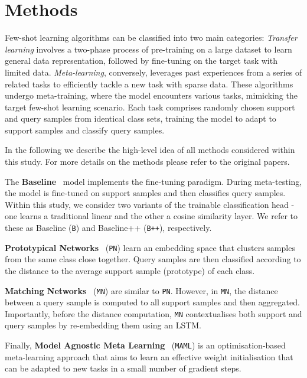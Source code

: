\section{Methods}

Few-shot learning algorithms can be classified into two main categories: \textit{Transfer learning} involves a two-phase process of pre-training on a large dataset to learn general data representation, 
followed by fine-tuning on the target task with limited data. \textit{Meta-learning}, conversely, leverages past experiences from a series of related tasks to efficiently tackle a new task with sparse data. 
These algorithms undergo meta-training, where the model encounters various tasks, mimicking the target few-shot learning scenario. Each task comprises randomly chosen support and query samples from identical class sets, 
training the model to adapt to support samples and classify query samples.

In the following we describe the high-level idea of all methods considered within this study. For more details on the methods please refer to the original papers.

The \textbf{Baseline}~\cite{baseline} model implements the fine-tuning paradigm. During meta-testing, the model is fine-tuned on support samples and then classifies query samples. Within this study, we consider two variants of the trainable classification head - one learns a traditional linear and the other a cosine similarity layer. We refer to these as Baseline (\texttt{B}) and Baseline++ (\texttt{B++}), respectively.

\textbf{Prototypical Networks}~\cite{protonet} (\texttt{PN}) learn an embedding space that clusters samples from the same class close together. 
Query samples are then classified according to the distance to the average support sample (prototype) of each class.

\textbf{Matching Networks}~\cite{matchingnet} (\texttt{MN}) are similar to \texttt{PN}. However, in \texttt{MN}, the distance between a query sample is computed to all support samples and then aggregated. 
Importantly, before the distance computation, \texttt{MN} contextualises both support and query samples by re-embedding them using an LSTM.

Finally, \textbf{Model Agnostic Meta Learning}~\cite{maml} (\texttt{MAML}) is an optimisation-based meta-learning approach that aims to learn an effective weight initialisation that can be adapted to new tasks in a small number of gradient steps.

